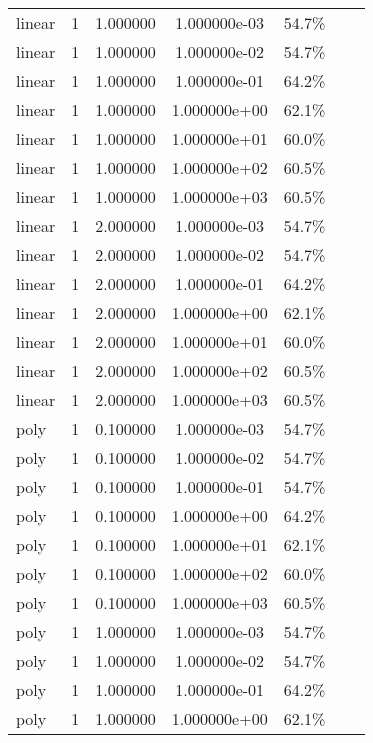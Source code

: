 \documentclass[11pt,spanish,listoffigures,listoftables]{tfgetsinf}
\begin{document}
\begin{table}
\begin{tabular}{l*{5}{c}r}
 linear & 1 & 1.000000 & 1.000000e-03 & 54.7\%\\
 linear & 1 & 1.000000 & 1.000000e-02 & 54.7\%\\
 linear & 1 & 1.000000 & 1.000000e-01 & 64.2\%\\
 linear & 1 & 1.000000 & 1.000000e+00 & 62.1\%\\
 linear & 1 & 1.000000 & 1.000000e+01 & 60.0\%\\
 linear & 1 & 1.000000 & 1.000000e+02 & 60.5\%\\
 linear & 1 & 1.000000 & 1.000000e+03 & 60.5\%\\
 linear & 1 & 2.000000 & 1.000000e-03 & 54.7\%\\
 linear & 1 & 2.000000 & 1.000000e-02 & 54.7\%\\
 linear & 1 & 2.000000 & 1.000000e-01 & 64.2\%\\
 linear & 1 & 2.000000 & 1.000000e+00 & 62.1\%\\
 linear & 1 & 2.000000 & 1.000000e+01 & 60.0\%\\
 linear & 1 & 2.000000 & 1.000000e+02 & 60.5\%\\
 linear & 1 & 2.000000 & 1.000000e+03 & 60.5\%\\
 poly & 1 & 0.100000 & 1.000000e-03 & 54.7\%\\
 poly & 1 & 0.100000 & 1.000000e-02 & 54.7\%\\
 poly & 1 & 0.100000 & 1.000000e-01 & 54.7\%\\
 poly & 1 & 0.100000 & 1.000000e+00 & 64.2\%\\
 poly & 1 & 0.100000 & 1.000000e+01 & 62.1\%\\
 poly & 1 & 0.100000 & 1.000000e+02 & 60.0\%\\
 poly & 1 & 0.100000 & 1.000000e+03 & 60.5\%\\
 poly & 1 & 1.000000 & 1.000000e-03 & 54.7\%\\
 poly & 1 & 1.000000 & 1.000000e-02 & 54.7\%\\
 poly & 1 & 1.000000 & 1.000000e-01 & 64.2\%\\
 poly & 1 & 1.000000 & 1.000000e+00 & 62.1\%\\
\end{tabular}
\end{table}
\end{document}
